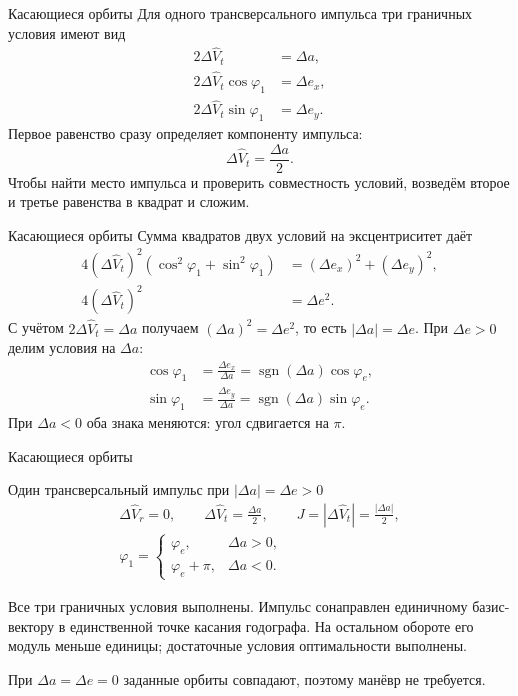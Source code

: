 \documentclass[11pt,aspectratio=169,t]{beamer}
\newcommand{\derivationmathspacing}{%
  \setlength{\abovedisplayskip}{2pt}%
  \setlength{\belowdisplayskip}{3pt}%
  \setlength{\abovedisplayshortskip}{2pt}%
  \setlength{\belowdisplayshortskip}{2pt}%
  \setlength{\jot}{2pt}}
\begin{document}
\begin{frame}{Касающиеся орбиты}
\relax
\derivationmathspacing
Для одного трансверсального импульса три граничных условия имеют вид
\[
\begin{aligned}
 2\Delta\widehat V_t&=\Delta a,\\
 2\Delta\widehat V_t\cos\varphi_1&=\Delta e_x,\\
 2\Delta\widehat V_t\sin\varphi_1&=\Delta e_y.
\end{aligned}
\]
Первое равенство сразу определяет компоненту импульса:
\[
 \Delta\widehat V_t=\frac{\Delta a}{2}.
\]
\justifying
Чтобы найти место импульса и проверить совместность условий,
возведём второе и третье равенства в квадрат и сложим.
\end{frame}

\begin{frame}{Касающиеся орбиты}
\relax
\derivationmathspacing
Сумма квадратов двух условий на эксцентриситет даёт
\[
\begin{aligned}
 4(\Delta\widehat V_t)^2(\cos^2\varphi_1+\sin^2\varphi_1)
   &=(\Delta e_x)^2+(\Delta e_y)^2,\\
 4(\Delta\widehat V_t)^2&=\Delta e^2.
\end{aligned}
\]
С учётом $2\Delta\widehat V_t=\Delta a$ получаем
$(\Delta a)^2=\Delta e^2$, то есть $|\Delta a|=\Delta e$.
При $\Delta e>0$ делим условия на $\Delta a$:
\[
\begin{aligned}
 \cos\varphi_1&=\frac{\Delta e_x}{\Delta a}
   =\operatorname{sgn}(\Delta a)\cos\varphi_e,\\
 \sin\varphi_1&=\frac{\Delta e_y}{\Delta a}
   =\operatorname{sgn}(\Delta a)\sin\varphi_e.
\end{aligned}
\]
При $\Delta a<0$ оба знака меняются: угол сдвигается на $\pi$.
\end{frame}

\begin{frame}{Касающиеся орбиты}
\relax
\derivationmathspacing
\begin{block}{Один трансверсальный импульс при $|\Delta a|=\Delta e>0$}
\[
\begin{gathered}
 \Delta\widehat V_r=0,\qquad
 \Delta\widehat V_t=\frac{\Delta a}{2},\qquad
 J=|\Delta\widehat V_t|=\frac{|\Delta a|}{2},\\[2pt]
 \varphi_1=\begin{cases}
   \varphi_e,&\Delta a>0,\\
   \varphi_e+\pi,&\Delta a<0.
 \end{cases}
\end{gathered}
\]
\end{block}
\justifying
Все три граничных условия выполнены. Импульс сонаправлен
единичному базис-вектору в единственной точке касания годографа.
На остальном обороте его модуль меньше единицы;
достаточные условия оптимальности выполнены.
\par\medskip
При $\Delta a=\Delta e=0$ заданные орбиты совпадают,
поэтому манёвр не требуется.
\end{frame}
\end{document}
